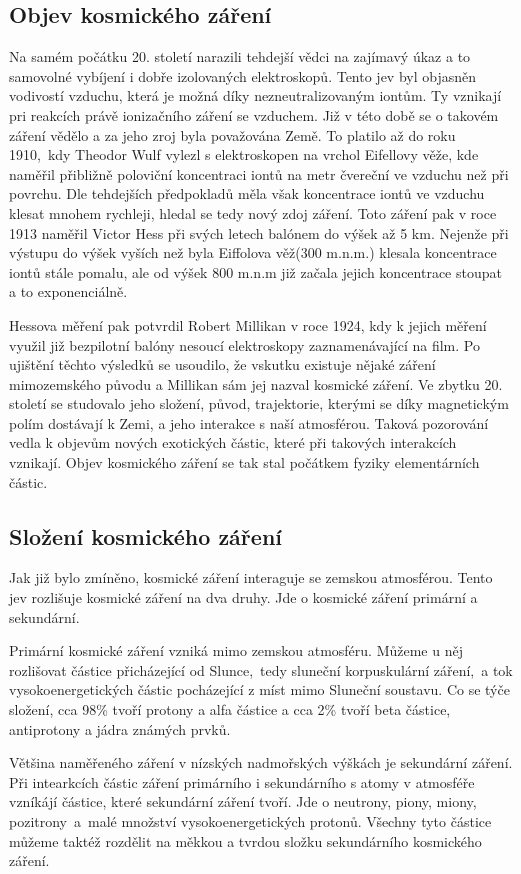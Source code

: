 \documentclass[11pt,a4paper]{article}
\begin{document}
\subsection*{Objev kosmického záření}
Na samém počátku 20. století narazili tehdejší vědci na zajímavý úkaz a to
samovolné vybíjení i dobře izolovaných elektroskopů. Tento jev byl objasněn
vodivostí vzduchu, která je možná díky nezneutralizovaným iontům. Ty vznikají
pri reakcích právě ionizačního záření se vzduchem. Již v této době se o takovém
záření vědělo a za jeho zroj byla považována Země. To platilo až do roku
1910,~kdy Theodor Wulf vylezl s elektroskopen na vrchol Eifellovy věže, kde
naměřil přibližně poloviční koncentraci iontů na metr čvereční ve vzduchu
než při povrchu. Dle tehdejších předpokladů měla však koncentrace iontů ve
vzduchu klesat mnohem rychleji, hledal se tedy nový zdoj záření. Toto záření
pak v roce 1913 naměřil Victor Hess při svých letech balónem do výšek až 5 km.
Nejenže při výstupu do výšek vyších než byla Eiffolova věž(300 m.n.m.) klesala
koncentrace iontů stále pomalu, ale od výšek 800 m.n.m již začala jejich
koncentrace stoupat a to exponenciálně.\par
Hessova měření pak potvrdil Robert Millikan v roce 1924, kdy k jejich měření
využil již bezpilotní balóny nesoucí elektroskopy zaznamenávající na film.
Po ujištění těchto výsledků se usoudilo, že vskutku existuje nějaké záření
mimozemského původu a Millikan sám jej nazval kosmické záření. Ve zbytku
20. století se studovalo jeho složení, původ, trajektorie, kterými se díky
magnetickým polím dostávají k Zemi, a jeho interakce s naší atmosférou. Taková
pozorování vedla k objevům nových exotických částic, které při takových
interakcích vznikají. Objev kosmického záření se tak stal počátkem fyziky
elementárních částic.\par
\subsection*{Složení kosmického záření}
Jak již bylo zmíněno, kosmické záření interaguje se zemskou atmosférou. Tento
jev rozlišuje kosmické záření na dva druhy. Jde o kosmické záření primární
a sekundární.\par
Primární kosmické záření vzniká mimo zemskou atmosféru. Můžeme u něj
rozlišovat částice přicházející od Slunce,~tedy sluneční korpuskulární
záření,~a tok vysokoenergetických částic pocházející z míst mimo Sluneční
soustavu. Co se týče složení, cca 98\% tvoří protony a alfa částice a cca 2\%
tvoří beta částice, antiprotony a jádra známých prvků.\par
Většina naměřeného záření v nízských nadmořských výškách je sekundární záření.
Při intearkcích částic záření primárního i sekundárního s atomy v atmosféře
vzníkájí částice, které sekundární záření tvoří. Jde o neutrony, piony, miony,
pozitrony~a~malé množství vysokoenergetických protonů. Všechny tyto částice
můžeme taktéž rozdělit na měkkou a tvrdou složku sekundárního kosmického
záření.\par
\end{document}
